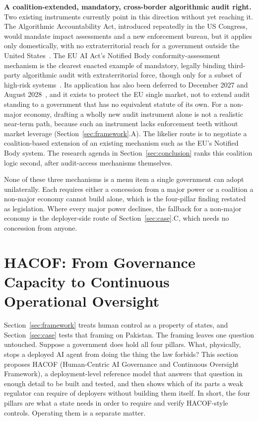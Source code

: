 \documentclass{ieeeaccess}
\newcommand{\hacof}{HACOF}
\begin{document}
\textbf{A coalition-extended, mandatory, cross-border algorithmic audit right.} Two existing instruments currently point in this direction without yet reaching it. The Algorithmic Accountability Act, introduced repeatedly in the US Congress, would mandate impact assessments and a new enforcement bureau, but it applies only domestically, with no extraterritorial reach for a government outside the United States~\cite{wyden2023algorithmic}. The EU AI Act's Notified Body conformity-assessment mechanism is the clearest enacted example of mandatory, legally binding third-party algorithmic audit with extraterritorial force, though only for a subset of high-risk systems~\cite{euaiact2024}. Its application has also been deferred to December 2027 and August 2028~\cite{euaiomnibus2026}, and it exists to protect the EU single market, not to extend audit standing to a government that has no equivalent statute of its own. For a non-major economy, drafting a wholly new audit instrument alone is not a realistic near-term path, because such an instrument lacks enforcement teeth without market leverage (Section~\ref{sec:framework}.A). The likelier route is to negotiate a coalition-based extension of an existing mechanism such as the EU's Notified Body system. The research agenda in Section~\ref{sec:conclusion} ranks this coalition logic second, after audit-access mechanisms themselves.

None of these three mechanisms is a menu item a single government can adopt unilaterally. Each requires either a concession from a major power or a coalition a non-major economy cannot build alone, which is the four-pillar finding restated as legislation. Where every major power declines, the fallback for a non-major economy is the deployer-side route of Section~\ref{sec:case}.C, which needs no concession from anyone.

\section{\hacof: From Governance Capacity to Continuous Operational Oversight}
\label{sec:hacof}

Section~\ref{sec:framework} treats human control as a property of states, and Section~\ref{sec:case} tests that framing on Pakistan. The framing leaves one question untouched. Suppose a government does hold all four pillars. What, physically, stops a deployed AI agent from doing the thing the law forbids? This section proposes \hacof{} (Human-Centric AI Governance and Continuous Oversight Framework), a deployment-level reference model that answers that question in enough detail to be built and tested, and then shows which of its parts a weak regulator can require of deployers without building them itself. In short, the four pillars are what a state needs in order to require and verify \hacof-style controls. Operating them is a separate matter.
\end{document}
